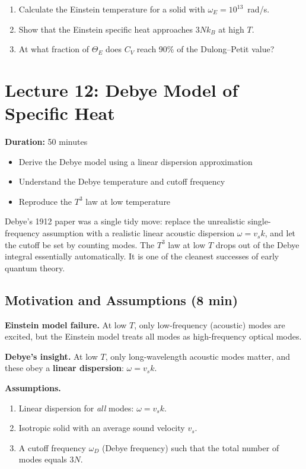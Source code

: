 \documentclass[11pt,a4paper]{article}
\newcommand{\lecheader}[3]{%
  \section{Lecture #1: #2}
  \noindent\textbf{Duration:} #3\par\vspace{4pt}
}
\begin{document}
\begin{probbox}
\begin{enumerate}
\item Calculate the Einstein temperature for a solid with $\omega_E=10^{13}$~rad/s.
\item Show that the Einstein specific heat approaches $3Nk_B$ at high $T$.
\item At what fraction of $\Theta_E$ does $C_V$ reach 90\% of the Dulong--Petit value?
\end{enumerate}
\end{probbox}

\newpage
\lecheader{12}{Debye Model of Specific Heat}{50 minutes}

\begin{keybox}
\begin{itemize}
\item Derive the Debye model using a linear dispersion approximation
\item Understand the Debye temperature and cutoff frequency
\item Reproduce the $T^3$ law at low temperature
\end{itemize}
\end{keybox}

\begin{histbox}
Debye's 1912 paper was a single tidy move: replace the unrealistic single-frequency
assumption with a realistic linear acoustic dispersion $\omega=v_s k$, and let the
cutoff be set by counting modes. The $T^3$ law at low $T$ drops out of the
Debye integral essentially automatically. It is one of the cleanest successes of
early quantum theory.
\end{histbox}

\subsection{Motivation and Assumptions \hfill \small(8 min)}

\textbf{Einstein model failure.} At low $T$, only low-frequency (acoustic) modes are
excited, but the Einstein model treats all modes as high-frequency optical modes.

\textbf{Debye's insight.} At low $T$, only long-wavelength acoustic modes matter, and
these obey a \textbf{linear dispersion}: $\omega=v_sk$.

\textbf{Assumptions.}
\begin{enumerate}
\item Linear dispersion for \emph{all} modes: $\omega=v_sk$.
\item Isotropic solid with an average sound velocity $v_s$.
\item A cutoff frequency $\omega_D$ (Debye frequency) such that the total number of
modes equals $3N$.
\end{enumerate}
\end{document}
